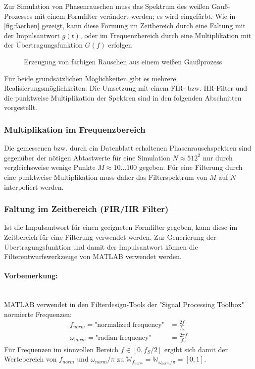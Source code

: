 Zur Simulation von Phasenrauschen muss das Spektrum des weißen Gauß-Prozesses mit einem Formfilter verändert werden; es wird eingefärbt. Wie in \autoref{fig:faerben} gezeigt, kann diese Formung im Zeitbereich durch eine Faltung mit der Impulsantwort $g(t)$, oder im Frequenzbereich durch eine Multiplikation mit der Übertragungsfunktion $G(f)$ erfolgen

\begin{figure}[H]
	\centering
	\caption[Erzeugen von farbigem Rauschen]{Erzeugung von farbigen Rauschen aus einem weißen Gaußprozess}
	\label{fig:faerben}
\end{figure}

Für beide grundsätzlichen Möglichkeiten gibt es mehrere Realisierungsmöglichkeiten. Die Umsetzung mit einem FIR- bzw. IIR-Filter und die punktweise Multiplikation der Spektren sind in den folgenden Abschnitten vorgestellt.

\subsubsection{Multiplikation im Frequenzbereich}
Die gemessenen bzw. durch ein Datenblatt erhaltenen Phasenrauschspektren sind gegenüber der nötigen Abtastwerte für eine Simulation $N\approx512^2$ nur durch vergleichsweise wenige Punkte $M\approx10...100$ gegeben. Für eine Filterung durch eine punktweise Multiplikation muss daher das Filterspektrum von $M$ auf $N$ interpoliert werden.

\subsubsection{Faltung im Zeitbereich (FIR/IIR Filter)}
Ist die Impulsantwort für einen geeigneten Formfilter gegeben, kann diese im Zeitbereich für eine Filterung verwendet werden. Zur Generierung der Übertragungsfunktion und damit der Impulsantwort können die Filterentwurfswerkzeuge von MATLAB verwendet werden.

\small{
\paragraph{Vorbemerkung:}\mbox{}\\
MATLAB verwendet in den Filterdesign-Tools der "Signal Processing Toolbox" normierte Frequenzen:
\begin{subequations}
	\begin{align}
	f_{norm} = \text{"normalized frequency"} &= \frac{2f}{f_S} \\
	\omega_{norm} = \text{"radian frequency"} &= \frac{2\pi f}{f_S}
	\end{align}
\end{subequations}
Für Frequenzen im sinnvollen Bereich $f\in [0,f_S/2]$ ergibt sich damit der Wertebereich von
$f_{norm}$ und $\omega_{norm}/\pi$ zu $\mathbb{W}_{f_{norm}}=\mathbb{W}_{\omega_{norm}/\pi}=[0,1]$.
}

